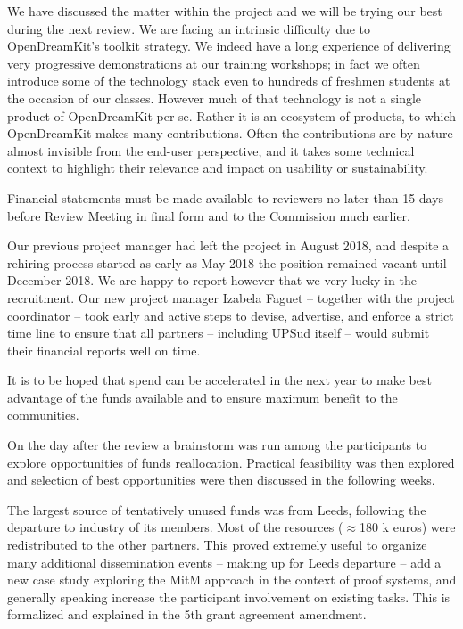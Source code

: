 We have discussed the matter within the project and we will be trying
our best during the next review. We are facing an intrinsic difficulty
due to OpenDreamKit's toolkit strategy. We indeed have a long
experience of delivering very progressive demonstrations at our
training workshops; in fact we often introduce some of the technology
stack even to hundreds of freshmen students at the occasion of our
classes. However much of that technology is not a single product of
OpenDreamKit per se. Rather it is an ecosystem of products, to which
OpenDreamKit makes many contributions. Often the contributions are by
nature almost invisible from the end-user perspective, and it takes
some technical context to highlight their relevance and impact on
usability or sustainability.

\begin{recommendation}
  Financial statements must be made available to reviewers no later
  than 15 days before Review Meeting in final form and to the
  Commission much earlier.
\end{recommendation}

Our previous project manager had left the project in August 2018, and
despite a rehiring process started as early as May 2018 the position
remained vacant until December 2018. We are happy to report however
that we very lucky in the recruitment. Our new project manager Izabela
Faguet -- together with the project coordinator -- took early and
active steps to devise, advertise, and enforce a strict time line to
ensure that all partners -- including UPSud itself -- would submit
their financial reports well on time.

\begin{recommendation}
  It is to be hoped that spend can be accelerated in the next year to
  make best advantage of the funds available and to ensure maximum
  benefit to the communities.
\end{recommendation}

On the day after the review a brainstorm was run among the
participants to explore opportunities of funds reallocation. Practical
feasibility was then explored and selection of best opportunities were
then discussed in the following weeks.

The largest source of tentatively unused funds was from Leeds,
following the departure to industry of its members. Most of the
resources ($\approx$180 k euros) were redistributed to the other partners.
This proved extremely useful to organize many additional dissemination
events -- making up for Leeds departure -- add a new case study
exploring the MitM approach in the context of proof systems, and
generally speaking increase the participant involvement on existing
tasks. This is formalized and explained in the 5th grant agreement
amendment.


